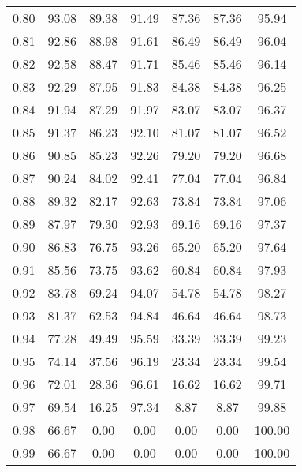 \begin{tabular}{|c|c|c|c|c|c|c|}
      0.80 &     93.08 &     89.38 &      91.49 &   87.36 &      87.36 &         95.94 \\
      0.81 &     92.86 &     88.98 &      91.61 &   86.49 &      86.49 &         96.04 \\
      0.82 &     92.58 &     88.47 &      91.71 &   85.46 &      85.46 &         96.14 \\
      0.83 &     92.29 &     87.95 &      91.83 &   84.38 &      84.38 &         96.25 \\
      0.84 &     91.94 &     87.29 &      91.97 &   83.07 &      83.07 &         96.37 \\
      0.85 &     91.37 &     86.23 &      92.10 &   81.07 &      81.07 &         96.52 \\
      0.86 &     90.85 &     85.23 &      92.26 &   79.20 &      79.20 &         96.68 \\
      0.87 &     90.24 &     84.02 &      92.41 &   77.04 &      77.04 &         96.84 \\
      0.88 &     89.32 &     82.17 &      92.63 &   73.84 &      73.84 &         97.06 \\
      0.89 &     87.97 &     79.30 &      92.93 &   69.16 &      69.16 &         97.37 \\
      0.90 &     86.83 &     76.75 &      93.26 &   65.20 &      65.20 &         97.64 \\
      0.91 &     85.56 &     73.75 &      93.62 &   60.84 &      60.84 &         97.93 \\
      0.92 &     83.78 &     69.24 &      94.07 &   54.78 &      54.78 &         98.27 \\
      0.93 &     81.37 &     62.53 &      94.84 &   46.64 &      46.64 &         98.73 \\
      0.94 &     77.28 &     49.49 &      95.59 &   33.39 &      33.39 &         99.23 \\
      0.95 &     74.14 &     37.56 &      96.19 &   23.34 &      23.34 &         99.54 \\
      0.96 &     72.01 &     28.36 &      96.61 &   16.62 &      16.62 &         99.71 \\
      0.97 &     69.54 &     16.25 &      97.34 &    8.87 &       8.87 &         99.88 \\
      0.98 &     66.67 &      0.00 &       0.00 &    0.00 &       0.00 &        100.00 \\
      0.99 &     66.67 &      0.00 &       0.00 &    0.00 &       0.00 &        100.00 \\
\bottomrule
\end{tabular}
